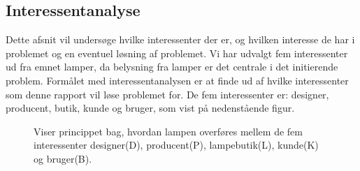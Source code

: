 \subsection{Interessentanalyse}
Dette afsnit vil undersøge hvilke interessenter der er, og hvilken interesse de har i problemet og en eventuel løsning af problemet. Vi har udvalgt fem interessenter ud fra emnet lamper, da belysning fra lamper er det centrale i det initierende problem. Formålet med interessentanalysen er at finde ud af hvilke interessenter som denne rapport vil løse problemet for. De fem interessenter er: designer, producent, butik, kunde og bruger, som vist på nedenstående figur.



\begin{figure}[H]
	\centering
  \caption{Viser princippet bag, hvordan lampen overføres mellem de fem interessenter designer(D), producent(P), lampebutik(L), kunde(K) og bruger(B).}
  \label{fig:interessenter}
\end{figure}







